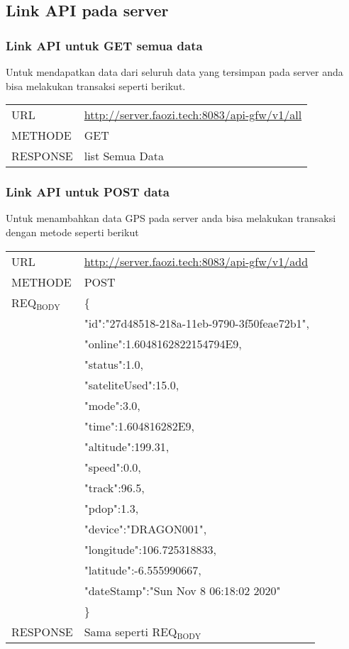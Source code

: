 \documentclass[11pt]{article}
\begin{document}
\subsection{Link API pada server}
\label{sec:org8db0090}
\subsubsection{Link API untuk GET semua data}
\label{sec:org029f415}
Untuk mendapatkan data dari seluruh data yang tersimpan pada
server anda bisa melakukan transaksi seperti berikut.
\begin{center}
\begin{tabular}{ll}
\hline
URL & \url{http://server.faozi.tech:8083/api-gfw/v1/all}\\
METHODE & GET\\
RESPONSE & list Semua Data\\
\end{tabular}
\end{center}

\subsubsection{Link API untuk POST data}
\label{sec:orge262a3d}
Untuk menambahkan data GPS pada server anda bisa melakukan
transaksi dengan metode seperti berikut
\begin{center}
\begin{tabular}{ll}
URL & \url{http://server.faozi.tech:8083/api-gfw/v1/add}\\
METHODE & POST\\
REQ\(_{\text{BODY}}\) & \{\\
 & "id":"27d48518-218a-11eb-9790-3f50feae72b1",\\
 & "online":1.6048162822154794E9,\\
 & "status":1.0,\\
 & "sateliteUsed":15.0,\\
 & "mode":3.0,\\
 & "time":1.604816282E9,\\
 & "altitude":199.31,\\
 & "speed":0.0,\\
 & "track":96.5,\\
 & "pdop":1.3,\\
 & "device":"DRAGON001",\\
 & "longitude":106.725318833,\\
 & "latitude":-6.555990667,\\
 & "dateStamp":"Sun Nov  8 06:18:02 2020\n"\\
 & \}\\
RESPONSE & Sama seperti REQ\(_{\text{BODY}}\)\\
\end{tabular}
\end{center}
\end{document}
